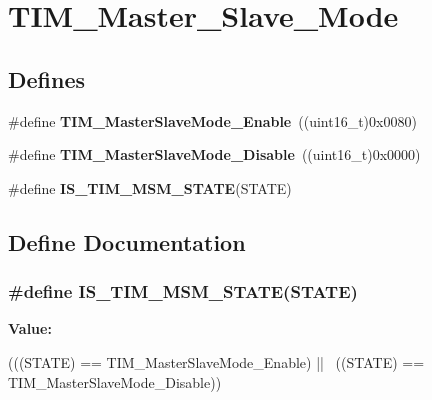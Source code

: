 \hypertarget{group__TIM__Master__Slave__Mode}{
\section{TIM\_\-Master\_\-Slave\_\-Mode}
\label{group__TIM__Master__Slave__Mode}
}
\subsection*{Defines}
\begin{DoxyCompactItemize}
\item 
\hypertarget{group__TIM__Master__Slave__Mode_gaef5da910ae6952fce424b440ea39f69a}{
\#define {\bfseries TIM\_\-MasterSlaveMode\_\-Enable}~((uint16\_\-t)0x0080)}
\label{group__TIM__Master__Slave__Mode_gaef5da910ae6952fce424b440ea39f69a}

\item 
\hypertarget{group__TIM__Master__Slave__Mode_ga8d4c7c0f57469f384b1327bb323d28a3}{
\#define {\bfseries TIM\_\-MasterSlaveMode\_\-Disable}~((uint16\_\-t)0x0000)}
\label{group__TIM__Master__Slave__Mode_ga8d4c7c0f57469f384b1327bb323d28a3}

\item 
\#define {\bfseries IS\_\-TIM\_\-MSM\_\-STATE}(STATE)
\end{DoxyCompactItemize}


\subsection{Define Documentation}
\hypertarget{group__TIM__Master__Slave__Mode_ga53146701cf287a0eca43b9232dffac60}{
\subsubsection[{IS\_\-TIM\_\-MSM\_\-STATE}]{\setlength{\rightskip}{0pt plus 5cm}\#define IS\_\-TIM\_\-MSM\_\-STATE(STATE)}}
\label{group__TIM__Master__Slave__Mode_ga53146701cf287a0eca43b9232dffac60}
{\bfseries Value:}
\begin{DoxyCode}
(((STATE) == TIM_MasterSlaveMode_Enable) || \
                                 ((STATE) == TIM_MasterSlaveMode_Disable))
\end{DoxyCode}
